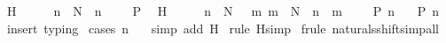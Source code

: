 \begin{isabellebody}
\ H{}\ \ \ \ \ {\isacharcolon}\ {\isachardoublequoteopen}{\isasymlbrakk}n\ {\isasymin}\ {\isacharpercent}N\ {\isacharsemicolon}\ n\ {\isacharequal}\ {}\ {\isasymrbrakk}\ {\isasymLongrightarrow}\ P\ {}{\isachardoublequoteclose}\isanewline
{}\ H{}\ \ \ \ \ {\isacharcolon}\ {\isachardoublequoteopen}{\isasymlbrakk}n\ {\isasymin}\ {\isacharpercent}N\ {\isacharsemicolon}\ {\isasymexists}\ m{\isachardot}\ {\isacharparenleft}m\ {\isasymin}\ {\isacharpercent}N\ {\isasymand}\ n\ {\isacharequal}\ m\ {\isacharplus}\ {}{\isacharparenright}\ {\isasymrbrakk}\ {\isasymLongrightarrow}\ P\ n{\isachardoublequoteclose}\isanewline
{}\ \ \ {\isachardoublequoteopen}P\ n{\isachardoublequoteclose}\isanewline
%
\isadelimproof
%
\endisadelimproof
%
\isatagproof
{}\isamarkupfalse%
\ {\isacharparenleft}insert\ typing{\isacharparenright}\isanewline
{}\isamarkupfalse%
\ {\isacharparenleft}cases\ {\isachardoublequoteopen}n\ {\isacharequal}\ {}{\isachardoublequoteclose}{\isacharparenright}\isanewline
{}\isamarkupfalse%
\ {\isacharparenleft}simp\ add{\isacharcolon}\ H{}{\isacharparenright}\isanewline
{}\isamarkupfalse%
\ {\isacharparenleft}rule\ H{}{\isacharcomma}simp{\isacharparenright}\isanewline
{}\isamarkupfalse%
\ {\isacharparenleft}frule\ naturals{\isacharunderscore}shift{\isacharcomma}simp{\isacharunderscore}all{\isacharparenright}\isanewline
{}\isamarkupfalse%
%
\endisatagproof
{\isafoldproof}%
%
\isadelimproof
\isanewline
%
\endisadelimproof
\isanewline
%
\isadelimtheory
\isanewline
%
\endisadelimtheory
%
\isatagtheory
{}\isamarkupfalse%
%
\endisatagtheory
{\isafoldtheory}%
%
\isadelimtheory
\isanewline
%
\endisadelimtheory
\isanewline
\end{isabellebody}%
